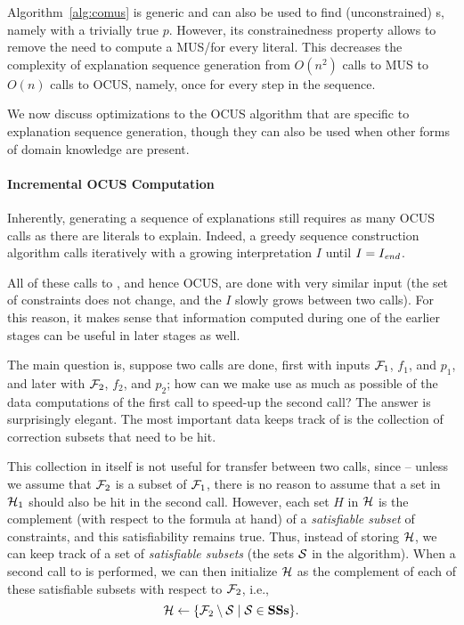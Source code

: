 Algorithm~\ref{alg:comus} is generic and can also be used to find (unconstrained) \omus{}s, namely with a trivially true $p$.
However, its constrainedness property allows to remove the need to compute a MUS/\omus for every literal. This decreases the complexity of explanation sequence generation from $O(n^2)$ calls to MUS to $O(n)$ calls to OCUS, namely, once for every step in the sequence. 

We now discuss optimizations to the OCUS algorithm that are specific to explanation sequence generation, though they can also be used when other forms of domain knowledge are present. 
 
\paragraph{Incremental OCUS Computation}
Inherently, generating a sequence of explanations still requires as many OCUS calls as there are literals to explain. 
Indeed, a greedy sequence construction algorithm %
calls \onestepo iteratively with a growing interpretation $I$ until $I=I_\mathit{end} $.

All of these calls to \onestepo, and hence OCUS, are done with very similar input (the set of constraints does not change, and the $I$ slowly grows between two calls). For this reason, it makes sense that information computed during one of the earlier stages can be useful in later stages as well. 

The main question is, suppose two \comus calls are done, first with inputs $\mathcal{F} _1$, $f_1$, and $p_1$, and later with $\mathcal{F} _2$, $f_2$, and $p_2$; how can we make use as much as possible of the data computations of the first call to speed-up the second call? The answer is surprisingly elegant. The most important data \comus keeps track of  is the collection \setstohit of correction subsets that need to be hit.

This collection in itself is not useful for transfer between two calls, since -- unless we assume that $\mathcal{F} _2$ is a subset of $\mathcal{F} _1$, there is no reason to assume that a set in $\mathcal{H}_1$ should also be hit in the second call. 
However, each set $H$ in $\mathcal{H}$ is the complement (with respect to the formula at hand) of a \emph{satisfiable subset} of constraints, and this satisfiability remains true. 
Thus, instead of storing $\mathcal{H}$, we can keep track of a set \satsets of \emph{satisfiable subsets} (the sets $\mathcal{S}$ in the \comus algorithm). 
When a second call to \comus is performed, we can then initialize $\mathcal{H}$ as the complement of each of these satisfiable subsets with respect to $\mathcal{F} _2$, i.e., \[\mathcal{H}\gets \{\mathcal{F} _2\setminus \mathcal{S}\mid \mathcal{S}\in \mathbf{SSs}\}.\]

